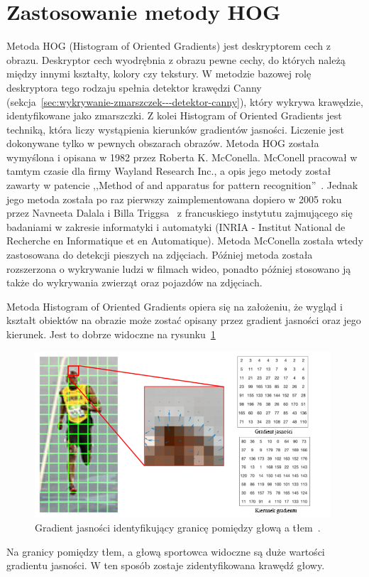 \documentclass[a4paper,twoside,12pt]{book}
\begin{document}
    \section{Zastosowanie metody HOG}\label{sec:zastosowanie-metody-hog}
    Metoda HOG (Histogram of Oriented Gradients) jest deskryptorem cech z obrazu.
    Deskryptor cech wyodrębnia z obrazu pewne cechy, do których należą między innymi kształty, kolory czy tekstury.
    W metodzie bazowej rolę deskryptora tego rodzaju spełnia detektor
    krawędzi Canny (sekcja~\ref{sec:wykrywanie-zmarszczek---detektor-canny}), który wykrywa krawędzie,
    identyfikowane jako zmarszczki.
    Z kolei Histogram of Oriented Gradients jest techniką, która liczy wystąpienia kierunków gradientów jasności.
    Liczenie jest dokonywane tylko w pewnych obszarach obrazów.
    Metoda HOG została wymyślona i opisana w 1982 przez Roberta K. McConella.
    McConell pracował w tamtym czasie dla firmy Wayland Research Inc.,
    a opis jego metody został zawarty w patencie ,,Method of and apparatus for pattern recognition''~\cite{patentHOG}.
    Jednak jego metoda została po raz pierwszy zaimplementowana dopiero w 2005 roku przez Navneeta Dalala i Billa Triggsa~\cite{hogZabojady}
    z francuskiego instytutu zajmującego się badaniami w zakresie informatyki i automatyki
    (INRIA - Institut National de Recherche en Informatique et en Automatique).
    Metoda McConella została wtedy zastosowana do detekcji pieszych na zdjęciach.
    Później metoda została rozszerzona o wykrywanie ludzi w filmach wideo,
    ponadto później stosowano ją także do wykrywania zwierząt oraz pojazdów na zdjęciach.

    Metoda Histogram of Oriented Gradients opiera się na założeniu, że wygląd i kształt obiektów na obrazie może zostać
    opisany przez gradient jasności oraz jego kierunek. Jest to dobrze widoczne na
    rysunku~\ref{fig.gradientJasnosciNaGlowie}

    \begin{figure}
        \centering
        \includegraphics[width=11cm]{Obrazy/gradientJasnosciNaGlowie.jpg}
        \caption{Gradient jasności identyfikujący granicę pomiędzy głową a tłem~\cite{hogOpenCv}.}
        \label{fig.gradientJasnosciNaGlowie}
    \end{figure}
    Na granicy pomiędzy tłem, a głową sportowca widoczne są duże wartości gradientu jasności.
    W ten sposób zostaje zidentyfikowana krawędź głowy.
\end{document}
